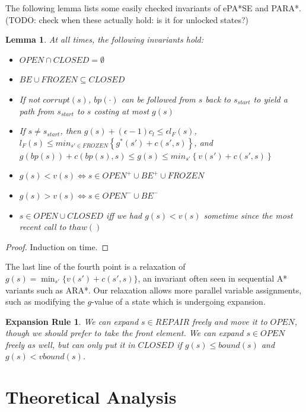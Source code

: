 \documentclass[letterpaper]{article}
\newtheorem{lemma}{Lemma}
\newtheorem{rul}{Expansion Rule}
\begin{document}
The following lemma lists some easily checked invariants of ePA*SE and PARA*. (TODO: check when these actually hold: is it for unlocked states?)

\begin{lemma}
\label{lem:prop}
At all times, the following invariants hold:
\begin{itemize}
\item $OPEN\cap CLOSED = \emptyset$
\item $BE\cup FROZEN \subseteq CLOSED$
\item If not $corrupt(s)$, $bp(\cdot)$ can be followed from $s$ back to $s_{start}$ to yield a path from $s_{start}$ to $s$ costing at most $g(s)$
\item If $s\ne s_{start}$, then $g(s) + (\epsilon-1)c_l \le \epsilon l_F(s)$,
\\$l_F(s) \le min_{s'\in FROZEN}\left\{g^*(s') + c(s',s)\right\}$, and
\\$g(bp(s)) + c(bp(s),s) \le g(s) \le min_{s'}\left\{v(s') + c(s',s)\right\}$
\item $g(s) < v(s) \Leftrightarrow s\in OPEN^+\cup BE^+\cup FROZEN$
\item $g(s) > v(s) \Leftrightarrow s\in OPEN^-\cup BE^-$
\item $s\in OPEN\cup CLOSED$ iff we had $g(s)<v(s)$ sometime since the most recent call to $thaw()$
\end{itemize}
\end{lemma}

\begin{proof}
Induction on time.
\end{proof}

The last line of the fourth point is a relaxation of $g(s) = \min_{s'}\{v(s') + c(s',s)\}$, an invariant often seen in sequential A* variants such as ARA*. Our relaxation allows more parallel variable assignments, such as modifying the $g$-value of a state which is undergoing expansion.

\begin{rul}
We can expand $s\in REPAIR$ freely and move it to $OPEN$, though we should prefer to take the front element. We can expand $s\in OPEN$ freely as well, but can only put it in $CLOSED$ if $g(s) \le bound(s)$ and $g(s) < vbound(s)$.
\end{rul}

\section{Theoretical Analysis}
\end{document}

